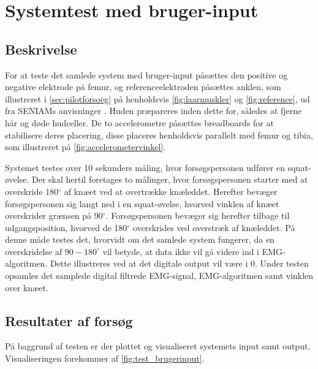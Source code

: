 \section{Systemtest med bruger-input}

\subsection{Beskrivelse}
For at teste det samlede system med bruger-input påsættes den positive og negative elektrode på femur, og referenceelektroden påsættes anklen, som illustreret i \autoref{sec:pilotforsoeg} på henholdsvis \autoref{fig:laarmuskler} og \autoref{fig:reference}, ud fra SENIAMs anvisninger \citep{seniam2016}. Huden præpareres inden dette for, således at fjerne hår og døde hudceller. 
De to accelerometre påsættes breadboards for at stabilisere deres placering, disse placeres henholdsvis parallelt med femur og tibia, som illustreret på \autoref{fig:accelerometervinkel}.

Systemet testes over 10 sekunders måling, hvor forsøgspersonen udfører en squat-øvelse. Der skal hertil foretages to målinger, hvor forsøgspersonen starter med at overskride 180$^{\circ}$ af knæet ved at overtrække knæleddet. Herefter bevæger forsøgspersonen sig langt ned i en squat-øvelse, hvorved vinklen af knæet overskrider grænsen på 90$^{\circ}$. Forsøgspersonen bevæger sig herefter tilbage til udgangsposition, hvorved de 180$^{\circ}$ overskrides ved overstræk af knæleddet.
På denne måde testes det, hvorvidt om det samlede system fungerer, da en overskridelse af $90-180^{\circ}$ vil betyde, at data ikke vil gå videre ind i EMG-algoritmen. Dette illustreres ved at det digitale output vil være i 0. Under testen opsamles det samplede digital filtrede EMG-signal, EMG-algoritmen samt vinklen over knæet.

\subsection{Resultater af forsøg}
På baggrund af testen er der plottet og visualiseret systemets input samt output. Visualiseringen forekommer af \autoref{fig:test_brugerinput}. 
 
